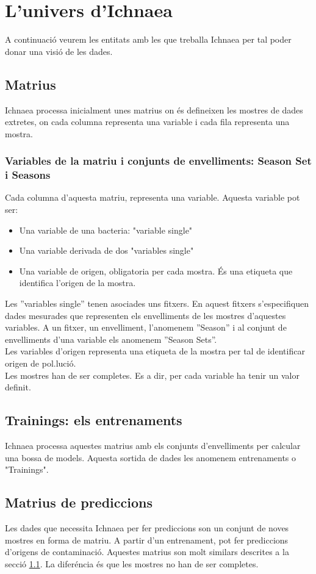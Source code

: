 \section{L'univers d'Ichnaea}
A continuaci\'{o} veurem les entitats amb les que treballa Ichnaea per tal poder donar una visi\'{o} de les dades.

\subsection{Matrius}
\label{cha:backgroud:univers:matrius}
Ichnaea processa inicialment unes matrius on \'e{s} defineixen les mostres de dades extretes, on cada columna representa una variable i cada fila representa una mostra. 

\subsubsection{Variables de la matriu i conjunts de envelliments: Season Set i Seasons}
\label{cha:backgroud:univers:matrius:variables_seasons}
Cada columna d'aquesta matriu, representa una variable. Aquesta variable pot ser:\\

\begin{itemize}
\item Una variable de una bacteria: "variable single"
\item Una variable derivada de dos "variables single"
\item Una variable de origen, obligatoria per cada mostra. \'{E}s una etiqueta que identifica l'origen de la mostra.
\end{itemize}

Les ''variables single'' tenen asociades uns fitxers. En aquest fitxers s'especifiquen dades mesurades que representen els envelliments de les mostres d'aquestes variables. A un fitxer, un envelliment, l'anomenem ''Season'' i al conjunt de envelliments d'una variable els anomenem ''Season Sets''.\\

Les variables d'origen representa una etiqueta de la mostra per tal de identificar origen de pol.luci\'{o}.\\

Les mostres han de ser completes. Es a dir, per cada variable ha tenir un valor definit.

\subsection{Trainings: els entrenaments}
Ichnaea processa aquestes matrius amb els conjunts d'envelliments per calcular una bossa de models. Aquesta sortida de dades les anomenem entrenaments o "Trainings". 

\subsection{Matrius de prediccions}
Les dades que necessita Ichnaea per fer prediccions son un conjunt de noves mostres en forma de matriu. A partir d'un entrenament, pot fer prediccions d'origens de contaminaci\'{o}. Aquestes matrius son molt similars descrites a la secci\'{o} \ref{cha:backgroud:univers:matrius}. La difer\'{e}ncia \'{e}s que les mostres no han de ser completes.